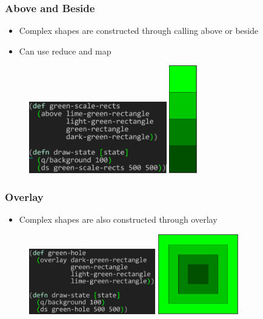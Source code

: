\documentclass{beamer}
\begin{document}
\begin{frame}
\frametitle{Above and Beside}
	\begin{itemize}
		\item Complex shapes are constructed through calling above or beside
		\item Can use reduce and map
	\end{itemize}
	\begin{figure}
	\vspace{-1cm}
	\includegraphics[width=6cm]{PresentationImages/greenScaleRects.png}
	\hspace{1.5cm}
	\includegraphics[width=1.2cm]{PresentationImages/greenScaleTower.png}
	\end{figure}
\end{frame}

\begin{frame}
\frametitle{Overlay}
	\begin{itemize}
		\item Complex shapes are also constructed through overlay
	\end{itemize}
	\begin{figure}
	\includegraphics[width=5.5cm]{PresentationImages/fcsGreenHoleCode.png}
	\hspace{1cm}
	\includegraphics[width=3.5cm]{PresentationImages/greenHole.png}
	\end{figure}
\end{frame}
\end{document}
